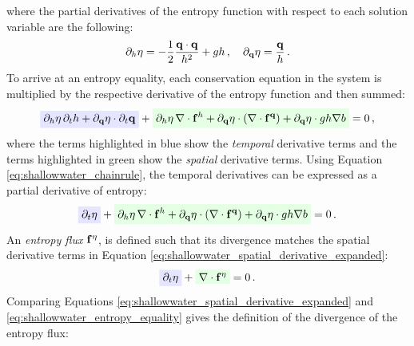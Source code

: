 where the partial derivatives of the entropy function with respect to each
solution variable are the following:
\begin{equation}
  \partial_h\eta
  = -\frac{1}{2}\frac{\mathbf{q}\cdot\mathbf{q}}{h^2}
  + gh \,,
  \quad
  \partial_{\mathbf{q}}\eta = \frac{\mathbf{q}}{h} \,.
\end{equation}
To arrive at an entropy equality, each conservation equation in the system
is multiplied by the respective derivative of the entropy function and then
summed:
\begin{equation}
  \highlightblue{\partial_\height\entropy\,\partial_\timevalue\height
  + \partial_\heightmomentum\entropy\cdot\partial_\timevalue\heightmomentum}
  + \highlightgreen{\partial_\height\entropy\,\divergence
    \mathbf{\consfluxletter}^\height
  + \partial_\heightmomentum\entropy\cdot\pr{\divergence 
    \mathbf{\consfluxletter}^\heightmomentum}
  + \partial_\heightmomentum\entropy\cdot\gravity\height\nabla\bathymetry}
  = 0 \eqc 
\end{equation}
where the terms highlighted in blue show the \emph{temporal} derivative terms
and the terms highlighted in green show the \emph{spatial} derivative terms.
Using Equation \eqref{eq:shallowwater_chainrule}, the temporal derivatives
can be expressed as a partial derivative of entropy:
\begin{equation}\label{eq:shallowwater_spatial_derivative_expanded}
  \highlightblue{\partial_\timevalue\entropy}
  + \highlightgreen{\partial_\height\entropy\,\divergence
    \mathbf{\consfluxletter}^\height
  + \partial_\heightmomentum\entropy\cdot\pr{\divergence
    \mathbf{\consfluxletter}^\heightmomentum}
  + \partial_\heightmomentum\entropy\cdot\gravity\height\nabla\bathymetry}
  = 0 \eqp
\end{equation}
An \emph{entropy flux} $\mathbf{f}^\eta$, is defined such
that its divergence matches the spatial derivative terms in Equation
\eqref{eq:shallowwater_spatial_derivative_expanded}:
\begin{equation}\label{eq:shallowwater_entropy_equality}
  \highlightblue{\partial_\timevalue\entropy}
  + \highlightgreen{\divergence\mathbf{\consfluxletter}^\entropy}
  = 0 \eqp
\end{equation}
Comparing Equations \eqref{eq:shallowwater_spatial_derivative_expanded} and
\eqref{eq:shallowwater_entropy_equality} gives the definition of the
divergence of the entropy flux:
